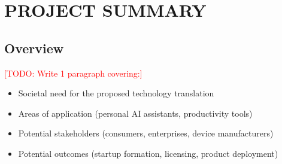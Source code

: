 \documentclass[11pt]{article}
\newcommand{\TODO}[1]{\textcolor{red}{[TODO: #1]}}
\begin{document}






\thispagestyle{empty}
\section*{PROJECT SUMMARY}

\subsection*{Overview}

\TODO{Write 1 paragraph covering:}
\begin{itemize}[noitemsep]
    \item Societal need for the proposed technology translation
    \item Areas of application (personal AI assistants, productivity tools)
    \item Potential stakeholders (consumers, enterprises, device manufacturers)
    \item Potential outcomes (startup formation, licensing, product deployment)
\end{itemize}
\end{document}
